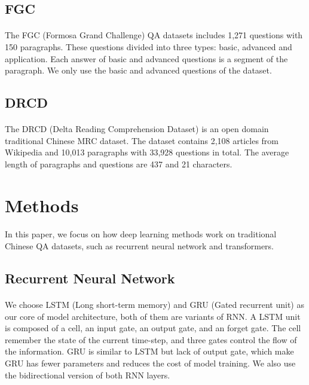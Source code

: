 \documentclass[12pt]{article}
\begin{document}
\subsection{FGC}
\paragraph{}
The FGC (Formosa Grand Challenge) QA datasets includes 1,271 questions with 150 paragraphs. These questions divided into three types: basic, advanced and application. Each answer of basic and advanced questions is a segment of the paragraph. We only use the basic and advanced questions of the dataset.

\subsection{DRCD}
\paragraph{}
The DRCD (Delta Reading Comprehension Dataset) is an open domain traditional Chinese MRC dataset. The dataset contains 2,108 articles from Wikipedia and 10,013 paragraphs with 33,928 questions in total. The average length of paragraphs and questions are 437 and 21 characters.

\section{Methods}
\paragraph{}
In this paper, we focus on how deep learning methods work on traditional Chinese QA datasets, such as recurrent neural network and transformers.

\subsection{Recurrent Neural Network}
\paragraph{}
We choose LSTM (Long short-term memory) and GRU (Gated recurrent unit) as our core of model architecture, both of them are variants of RNN. A LSTM unit is composed of a cell, an input gate, an output gate, and an forget gate. The cell remember the state of the current time-step, and three gates control the flow of the information. GRU is similar to LSTM but lack of output gate, which make GRU has fewer parameters and reduces the cost of model training. We also use the bidirectional version of both RNN layers.
\end{document}
